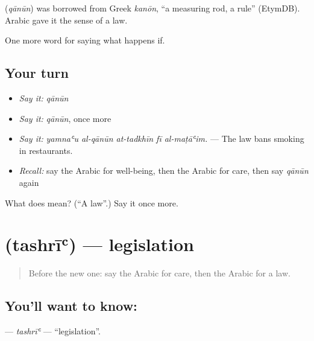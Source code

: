 \begin{cousinweb}
\textbf{} (\emph{qānūn}) was borrowed from Greek \emph{kanōn}, \textquotedblleft{}a measuring rod, a rule\textquotedblright{} (EtymDB). Arabic gave it the sense of a law.
\end{cousinweb}

\begin{grammarlens}[title={What you've built}]
One more word for saying what happens if.
\end{grammarlens}

\subsection*{Your turn}
\begin{itemize}
\raggedright
  \item \emph{Say it:} \emph{qānūn}
  \item \emph{Say it:} \emph{qānūn}, once more
  \item \emph{Say it:} \emph{yamnaʿu al-qānūn at-tadkhīn fī al-maṭāʿim.} — The law bans smoking in restaurants.
  \item \emph{Recall:} say the Arabic for well-being, then the Arabic for care, then say \emph{qānūn} again
\end{itemize}

\begin{tcolorbox}[breakable,colback=teal!4,colframe=teal!35!black,title={Before you move on}]
What does  mean? (\textquotedblleft{}A law\textquotedblright{}.) Say it once more.
\end{tcolorbox}
\section[\texorpdfstring{\ar{تشريع} (tashrīʿ)}{تشريع (tashrīʿ)}]{ (tashrīʿ) — legislation}

\label{lesson:AR-C409-tashri}



\begin{quote}
Before the new one: say the Arabic for care, then the Arabic for a law.
\end{quote}

\subsection*{You'll want to know: }
\textbf{} — \emph{tashrīʿ} — \textquotedblleft{}legislation\textquotedblright{}.

